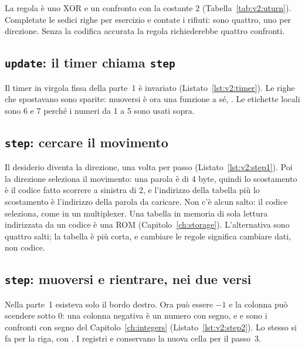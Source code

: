 La regola è uno XOR e un confronto con la costante 2
(Tabella~\ref{tab:v2:uturn}). Completate le sedici righe per esercizio e
contate i rifiuti: sono quattro, uno per direzione. Senza la codifica accurata
la regola richiederebbe quattro confronti.

\subsection{\texttt{update}: il timer chiama \texttt{step}}


Il timer in virgola fissa della parte~1 è invariato
(Listato~\ref{lst:v2:timer}). Le righe che spostavano  sono
sparite: muoversi è ora una funzione a sé, . Le etichette locali
sono 6 e 7 perché i numeri da 1 a 5 sono usati sopra.

\subsection{\texttt{step}: cercare il movimento}


Il desiderio diventa la direzione, una volta per passo
(Listato~\ref{lst:v2:step1}). Poi la direzione seleziona il movimento: una
parola è di 4 byte, quindi lo scostamento è il codice fatto scorrere a sinistra
di 2, e l'indirizzo della tabella più lo scostamento è l'indirizzo della parola
da caricare. Non c'è alcun salto: il codice seleziona, come in un multiplexer.
Una tabella in memoria di sola lettura indirizzata da un codice è una ROM
(Capitolo~\ref{ch:storage}). L'alternativa sono quattro salti; la tabella è più
corta, e cambiare le regole significa cambiare dati, non codice.

\subsection{\texttt{step}: muoversi e rientrare, nei due versi}


Nella parte~1 esisteva solo il bordo destro. Ora  può essere $-1$ e la
colonna può scendere sotto 0: una colonna negativa è un numero con segno, e
 e  sono i confronti con segno del
Capitolo~\ref{ch:integers} (Listato~\ref{lst:v2:step2}). Lo stesso si fa per la
riga, con . I registri  e  conservano la nuova cella
per il passo~3.

